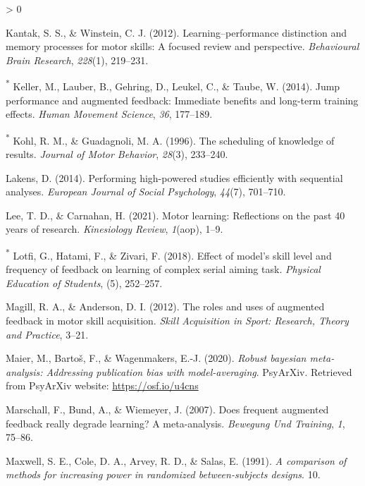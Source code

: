 \documentclass[
  english,
  man,mask,floatsintext]{apa7}
\newlength{\cslhangindent}
\newenvironment{CSLReferences}[2] %
 {%
  \setlength{\parindent}{0pt}
  \ifodd #1 \everypar{\setlength{\hangindent}{\cslhangindent}}\ignorespaces\fi
  \ifnum #2 > 0
  \setlength{\parskip}{#2\baselineskip}
  \fi
 }%
 {}
\begin{document}
\begin{CSLReferences}{1}{0}
\leavevmode\hypertarget{ref-Kantak2012}{}%
Kantak, S. S., \& Winstein, C. J. (2012). Learning--performance distinction and memory processes for motor skills: A focused review and perspective. \emph{Behavioural Brain Research}, \emph{228}(1), 219--231.

\leavevmode\hypertarget{ref-Keller2014}{}%
\textsuperscript{*} Keller, M., Lauber, B., Gehring, D., Leukel, C., \& Taube, W. (2014). Jump performance and augmented feedback: Immediate benefits and long-term training effects. \emph{Human Movement Science}, \emph{36}, 177--189.

\leavevmode\hypertarget{ref-Kohl1996}{}%
\textsuperscript{*} Kohl, R. M., \& Guadagnoli, M. A. (1996). The scheduling of knowledge of results. \emph{Journal of Motor Behavior}, \emph{28}(3), 233--240.

\leavevmode\hypertarget{ref-Lakens2014}{}%
Lakens, D. (2014). Performing high-powered studies efficiently with sequential analyses. \emph{European Journal of Social Psychology}, \emph{44}(7), 701--710.

\leavevmode\hypertarget{ref-Lee2021}{}%
Lee, T. D., \& Carnahan, H. (2021). Motor learning: Reflections on the past 40 years of research. \emph{Kinesiology Review}, \emph{1}(aop), 1--9.

\leavevmode\hypertarget{ref-Lotfi2018}{}%
\textsuperscript{*} Lotfi, G., Hatami, F., \& Zivari, F. (2018). Effect of model's skill level and frequency of feedback on learning of complex serial aiming task. \emph{Physical Education of Students}, (5), 252--257.

\leavevmode\hypertarget{ref-Magill2012}{}%
Magill, R. A., \& Anderson, D. I. (2012). The roles and uses of augmented feedback in motor skill acquisition. \emph{Skill Acquisition in Sport: Research, Theory and Practice}, 3--21.

\leavevmode\hypertarget{ref-Maier2020}{}%
Maier, M., Bartoš, F., \& Wagenmakers, E.-J. (2020). \emph{Robust bayesian meta-analysis: Addressing publication bias with model-averaging}. PsyArXiv. Retrieved from PsyArXiv website: \url{https://osf.io/u4cns}

\leavevmode\hypertarget{ref-Marschall2007}{}%
Marschall, F., Bund, A., \& Wiemeyer, J. (2007). Does frequent augmented feedback really degrade learning? A meta-analysis. \emph{Bewegung Und Training}, \emph{1}, 75--86.

\leavevmode\hypertarget{ref-Maxwell1991}{}%
Maxwell, S. E., Cole, D. A., Arvey, R. D., \& Salas, E. (1991). \emph{A comparison of methods for increasing power in randomized between-subjects designs}. 10.


\end{CSLReferences}
\end{document}
